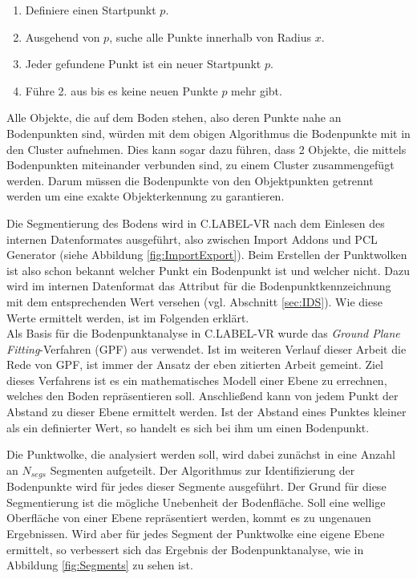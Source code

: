 \begin{enumerate}
\item Definiere einen Startpunkt $p$.
\item Ausgehend von $p$, suche alle Punkte innerhalb von Radius \(x\). 
\item Jeder gefundene Punkt ist ein neuer Startpunkt $p$.
\item Führe 2. aus bis es keine neuen Punkte $p$ mehr gibt.
\end{enumerate} 

Alle Objekte, die auf dem Boden stehen, also deren Punkte nahe an Bodenpunkten sind, würden mit dem obigen Algorithmus die Bodenpunkte mit in den Cluster aufnehmen. Dies kann sogar dazu führen, dass 2 Objekte, die mittels Bodenpunkten miteinander verbunden sind, zu einem Cluster zusammengefügt werden. Darum müssen die Bodenpunkte von den Objektpunkten getrennt werden um eine exakte Objekterkennung zu garantieren.

Die Segmentierung des Bodens wird in C.LABEL-VR nach dem Einlesen des internen Datenformates ausgeführt, also zwischen Import Addons und PCL Generator (siehe Abbildung \ref{fig:ImportExport}). Beim Erstellen der Punktwolken ist also schon bekannt welcher Punkt ein Bodenpunkt ist und welcher nicht. Dazu wird im internen Datenformat das Attribut für die Bodenpunktkennzeichnung mit dem entsprechenden Wert versehen (vgl. Abschnitt \ref{sec:IDS}). Wie diese Werte ermittelt werden, ist im Folgenden erklärt.\\

Als Basis für die Bodenpunktanalyse in C.LABEL-VR wurde das \textit{Ground Plane Fitting}-Verfahren (GPF) aus \cite{bib:Segmentation1} verwendet. Ist im weiteren Verlauf dieser Arbeit die Rede von GPF, ist immer der Ansatz der eben zitierten Arbeit gemeint. Ziel dieses Verfahrens ist es ein mathematisches Modell einer Ebene zu errechnen, welches den Boden repräsentieren soll. Anschließend kann von jedem Punkt der Abstand zu dieser Ebene ermittelt werden. Ist der Abstand eines Punktes kleiner als ein definierter Wert, so handelt es sich bei ihm um einen Bodenpunkt.

Die Punktwolke, die analysiert werden soll, wird dabei zunächst in eine Anzahl an $N_{segs}$ Segmenten aufgeteilt. Der Algorithmus zur Identifizierung der Bodenpunkte wird für jedes dieser Segmente ausgeführt. Der Grund für diese Segmentierung ist die mögliche Unebenheit der Bodenfläche. Soll eine wellige Oberfläche von einer Ebene repräsentiert werden, kommt es zu ungenauen Ergebnissen. Wird aber für jedes Segment der Punktwolke eine eigene Ebene ermittelt, so verbessert sich das Ergebnis der Bodenpunktanalyse, wie in Abbildung \ref{fig:Segments} zu sehen ist.

